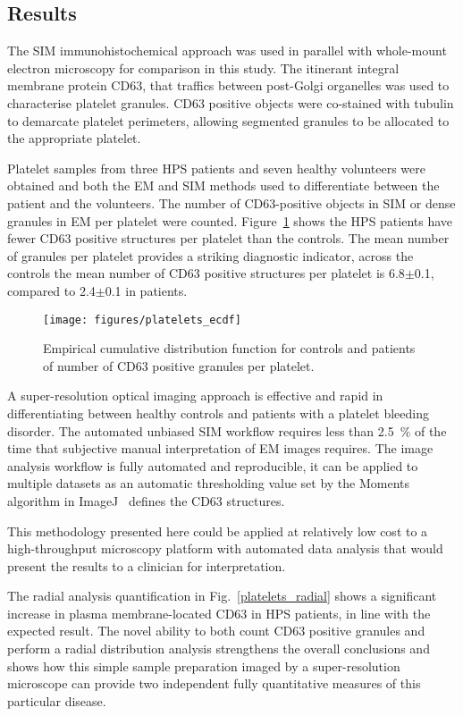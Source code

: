 \subsection{Results}
The SIM immunohistochemical approach was used in parallel with whole-mount electron microscopy for comparison in this study. The itinerant integral membrane protein CD63, that traffics between post-Golgi organelles was used to characterise platelet granules. CD63 positive objects were co-stained with tubulin to demarcate platelet perimeters, allowing segmented granules to be allocated to the appropriate platelet.

Platelet samples from three HPS patients and seven healthy volunteers were obtained and both the EM and SIM methods used to differentiate between the patient and the volunteers. The number of CD63-positive objects in SIM or dense granules in EM per platelet were counted. Figure~\ref{platelet_ecdf} shows the HPS patients have fewer CD63 positive structures per platelet than the controls. The mean number of granules per platelet provides a striking diagnostic indicator, across the controls the mean number of CD63 positive structures per platelet is 6.8$\pm$0.1, compared to 2.4$\pm$0.1 in patients.

\begin{figure}[htbp]
	\centering
	\texttt{[image: figures/platelets\_ecdf]}
	\caption{\small{Empirical cumulative distribution function for controls and patients of number of CD63 positive granules per platelet.}}
	\label{platelet_ecdf}
\end{figure}

A super-resolution optical imaging approach is effective and rapid in differentiating between healthy controls and patients with a platelet bleeding disorder. The automated unbiased SIM workflow requires less than \SI{2.5}{\percent} of the time that subjective manual interpretation of EM images requires.  The image analysis workflow is fully automated and reproducible, it can be applied to multiple datasets as an automatic thresholding value set by the Moments algorithm in ImageJ~\cite{Schneider2012} defines the CD63 structures.

This methodology presented here could be applied at relatively low cost to a high-throughput microscopy platform with automated data analysis that would present the results to a clinician for interpretation.

The radial analysis quantification in Fig.~\ref{platelets_radial} shows a significant increase in plasma membrane-located CD63 in HPS patients, in line with the expected result. The novel ability to both count CD63 positive granules and perform a radial distribution analysis strengthens the overall conclusions and shows how this simple sample preparation imaged by a super-resolution microscope can provide two independent fully quantitative measures of this particular disease.

